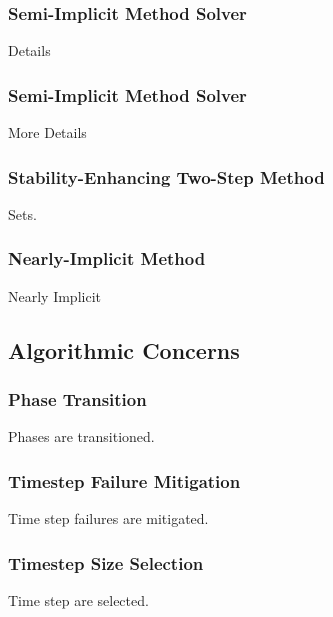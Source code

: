 \documentclass[compress,xcolor=table]{beamer}
\begin{document}
\begin{frame}
\frametitle{Semi-Implicit Method Solver}

Details

\end{frame}
\begin{frame}
\frametitle{Semi-Implicit Method Solver}

More Details

\end{frame}
\begin{frame}
\frametitle{Stability-Enhancing Two-Step Method}

Sets.

\end{frame}
\begin{frame}
\frametitle{Nearly-Implicit Method}

Nearly Implicit

\end{frame}
\subsection[Algorithmic Concerns]{Algorithmic Concerns}
\begin{frame}
\frametitle{Phase Transition}

Phases are transitioned.

\end{frame}
\begin{frame}
\frametitle{Timestep Failure Mitigation}

Time step failures are mitigated.

\end{frame}
\begin{frame}
\frametitle{Timestep Size Selection}

Time step are selected.

\end{frame}
\end{document}
